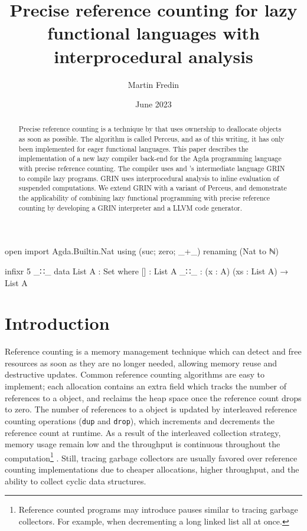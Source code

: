 \documentclass[10pt, twocolumn]{article}
\title{ Precise reference counting for lazy functional languages with interprocedural analysis}
\author{Martin Fredin}
\date{June 2023}
\begin{document}
\maketitle


\begin{code}[hide]
open import Agda.Builtin.Nat using (suc; zero; _+_) renaming (Nat to ℕ) 

infixr 5 _∷_
data List A : Set where
  []  : List A
  _∷_ : (x : A) (xs : List A) → List A
\end{code}

\begin{abstract}
Precise reference counting is a technique by \citeauthor{reinking2021} that uses ownership to deallocate objects as soon as possible. 
The algorithm is called Perceus, and as of this writing, it has only been implemented for eager functional languages.
This paper describes the implementation of a new lazy compiler back-end for the Agda programming language with 
precise reference counting. 
The compiler uses \citeauthor{boquist1999} and \citeauthor{johnsson1991}'s intermediate language GRIN to compile lazy programs. 
GRIN uses interprocedural analysis to inline evaluation of suspended computations.
We extend GRIN with a variant of Perceus, and demonstrate the applicability of combining lazy functional programming with precise reference counting by developing a GRIN interpreter and a LLVM code generator. 
\end{abstract}

\section{Introduction}

Reference counting \citep{collins1960} is a memory management technique which can detect and free resources as soon as they are no longer needed, allowing memory reuse and destructive updates. 
Common reference counting algorithms are easy to implement; each allocation contains an extra field which tracks the number of references to a object, and reclaims the heap space once the reference count drops to zero.
The number of references to a object is updated by interleaved reference counting operations (\texttt{dup} and \texttt{drop}), which increments and decrements the reference count at runtime. 
As a result of the interleaved collection strategy, memory usage remain low and the throughput is continuous throughout the computation\footnote{Reference counted programs may introduce pauses similar to tracing garbage collectors. For example, when decrementing a long linked list all at once.} \citep{jones1996}.
Still, tracing garbage collectors are usually favored over reference counting implementations due to cheaper allocations, higher throughput, and the ability to collect cyclic data structures.
\end{document}
